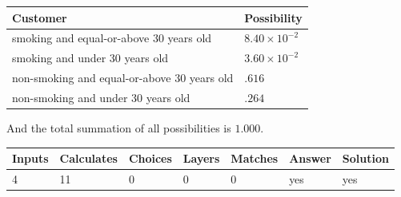 \documentclass[12pt]{article}
\begin{document}
 

 
\noindent
\begin{tabular}{|l|l|}
\hline
Customer & Possibility \\
\hline
smoking  and  %
equal-or-above 30 years old &
  $ %
8.40 \times 10^{-2}$ \\
\hline
smoking  and  %
under 30 years old &
  $ %
3.60 \times 10^{-2}$ \\
\hline
 non-smoking and  %
equal-or-above 30 years old &
  $ %
.616$ \\
\hline
 non-smoking and  %
under 30 years old &
  $ %
.264$ \\
\hline
\end{tabular}
 
\noindent
 And the total summation of all possibilities is $  %
1.000 $.
 
 
 
\noindent{}
 
 

 
\vspace{0.3in}
   
   
   
   
\noindent\begin{tabular}{|l|l|l|l|l|l|l|}
 \hline
Inputs & Calculates & Choices & Layers & Matches & Answer & Solution \\ \hline
           4 & 
          11 & 
           0
  & 
           0 & 
           0 & 
  yes & 
  yes 
  \\ \hline
 \end{tabular}
   
   
   
   
\noindent{}
   
   
  
\end{document}
